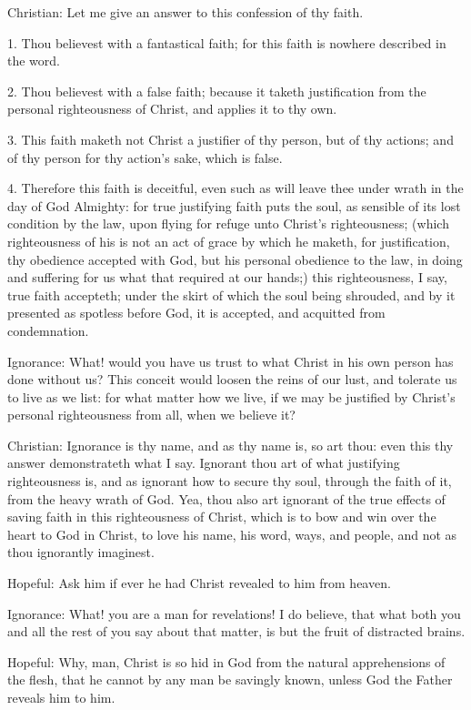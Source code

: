 Christian: Let me give an answer to this confession of thy faith.

1. Thou believest with a fantastical faith; for this faith is nowhere described in the word.

2. Thou believest with a false faith; because it taketh justification from the personal righteousness of Christ, and applies it to thy own.

3. This faith maketh not Christ a justifier of thy person, but of thy actions; and of thy person for thy action's sake, which is false.

4. Therefore this faith is deceitful, even such as will leave thee under wrath in the day of God Almighty: for true justifying faith puts the soul, as sensible of its lost condition by the law, upon flying for refuge unto Christ's righteousness; (which righteousness of his is not an act of grace by which he maketh, for justification, thy obedience accepted with God, but his personal obedience to the law, in doing and suffering for us what that required at our hands;) this righteousness, I say, true faith accepteth; under the skirt of which the soul being shrouded, and by it presented as spotless before God, it is accepted, and acquitted from condemnation.

Ignorance: What! would you have us trust to what Christ in his own person has done without us? This conceit would loosen the reins of our lust, and tolerate us to live as we list: for what matter how we live, if we may be justified by Christ's personal righteousness from all, when we believe it?

Christian: Ignorance is thy name, and as thy name is, so art thou: even this thy answer demonstrateth what I say. Ignorant thou art of what justifying righteousness is, and as ignorant how to secure thy soul, through the faith of it, from the heavy wrath of God. Yea, thou also art ignorant of the true effects of saving faith in this righteousness of Christ, which is to bow and win over the heart to God in Christ, to love his name, his word, ways, and people, and not as thou ignorantly imaginest.

Hopeful: Ask him if ever he had Christ revealed to him from heaven.

Ignorance: What! you are a man for revelations! I do believe, that what both you and all the rest of you say about that matter, is but the fruit of distracted brains.

Hopeful: Why, man, Christ is so hid in God from the natural apprehensions of the flesh, that he cannot by any man be savingly known, unless God the Father reveals him to him.

